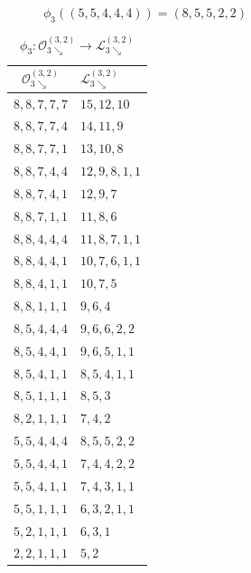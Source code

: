 \documentclass[11pt,reqno]{amsart}
\numberwithin{equation}{section}
\theoremstyle{plain}
\theoremstyle{definition}
\newcommand{\OO}{\mathcal{O}}
\newcommand{\LL}{\mathcal{L}}
\begin{document}
\begin{figure}[htp]
\begin{ferrers}
\putbelow
{}
\putright
{}

\end{ferrers}
\caption{$\phi_3((5,5,4,4,4))=(8,5,5,2,2)$}
\label{phi map}
\end{figure}

\begin{table}[tbp]\caption{$\phi_3:\OO_{3\searrow}^{(3,2)}\longrightarrow\LL_{3\searrow}^{(3,2)}$}\label{tab: phi_3}
\centering
\begin{tabular}{c||l}
\hline
 $\OO_{3\searrow}^{(3,2)}$ & \quad $\LL_{3\searrow}^{(3,2)}$\\
\hline
$8,8,7,7,7$ & $15,12,10$ \\
$8,8,7,7,4$ & $14,11,9$ \\
$8,8,7,7,1$ & $13,10,8$ \\
$8,8,7,4,4$ & $12,9,8,1,1$ \\
$8,8,7,4,1$ & $12,9,7$ \\
$8,8,7,1,1$ & $11,8,6$ \\
$8,8,4,4,4$ & $11,8,7,1,1$ \\
$8,8,4,4,1$ & $10,7,6,1,1$ \\
$8,8,4,1,1$ & $10,7,5$ \\
$8,8,1,1,1$ & $9,6,4$ \\
$8,5,4,4,4$ & $9,6,6,2,2$ \\
$8,5,4,4,1$ & $9,6,5,1,1$ \\
$8,5,4,1,1$ & $8,5,4,1,1$ \\
$8,5,1,1,1$ & $8,5,3$ \\
$8,2,1,1,1$ & $7,4,2$ \\
$5,5,4,4,4$ & $8,5,5,2,2$ \\
$5,5,4,4,1$ & $7,4,4,2,2$ \\
$5,5,4,1,1$ & $7,4,3,1,1$ \\
$5,5,1,1,1$ & $6,3,2,1,1$ \\
$5,2,1,1,1$ & $6,3,1$ \\
$2,2,1,1,1$ & $5,2$ \\
\hline
\end{tabular}
\end{table}
\end{document}
